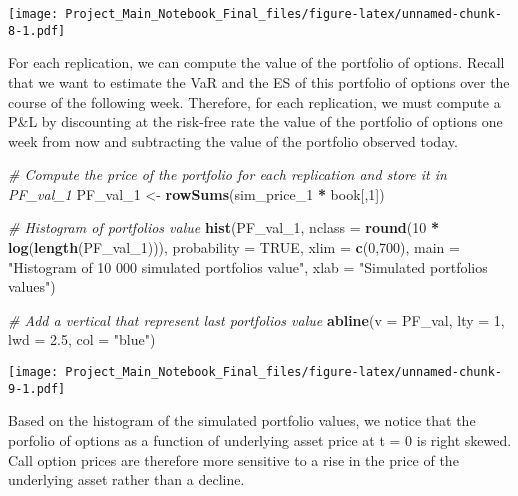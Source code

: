 \documentclass[]{article}
\newenvironment{Shaded}{\begin{snugshade}}{\end{snugshade}}
\newcommand{\CommentTok}[1]{\textcolor[rgb]{0.56,0.35,0.01}{\textit{#1}}}
\newcommand{\DataTypeTok}[1]{\textcolor[rgb]{0.13,0.29,0.53}{#1}}
\newcommand{\DecValTok}[1]{\textcolor[rgb]{0.00,0.00,0.81}{#1}}
\newcommand{\FloatTok}[1]{\textcolor[rgb]{0.00,0.00,0.81}{#1}}
\newcommand{\KeywordTok}[1]{\textcolor[rgb]{0.13,0.29,0.53}{\textbf{#1}}}
\newcommand{\NormalTok}[1]{#1}
\newcommand{\OperatorTok}[1]{\textcolor[rgb]{0.81,0.36,0.00}{\textbf{#1}}}
\newcommand{\OtherTok}[1]{\textcolor[rgb]{0.56,0.35,0.01}{#1}}
\newcommand{\StringTok}[1]{\textcolor[rgb]{0.31,0.60,0.02}{#1}}
\begin{document}
\texttt{[image: Project\_Main\_Notebook\_Final\_files/figure-latex/unnamed-chunk-8-1.pdf]}

For each replication, we can compute the value of the portfolio of
options. Recall that we want to estimate the VaR and the ES of this
portfolio of options over the course of the following week. Therefore,
for each replication, we must compute a P\&L by discounting at the
risk-free rate the value of the portfolio of options one week from now
and subtracting the value of the portfolio observed today.

\begin{Shaded}
\begin{Highlighting}[]
\CommentTok{\# Compute the price of the portfolio for each replication and store it in \textquotesingle{}PF\_val\_1\textquotesingle{}}
\NormalTok{PF\_val\_}\DecValTok{1}\NormalTok{ <{-}}\StringTok{ }\KeywordTok{rowSums}\NormalTok{(sim\_price\_}\DecValTok{1} \OperatorTok{*}\StringTok{ }\NormalTok{book[,}\DecValTok{1}\NormalTok{])}

\CommentTok{\# Histogram of portfolio\textquotesingle{}s value}
\KeywordTok{hist}\NormalTok{(PF\_val\_}\DecValTok{1}\NormalTok{, }\DataTypeTok{nclass =} \KeywordTok{round}\NormalTok{(}\DecValTok{10} \OperatorTok{*}\StringTok{ }\KeywordTok{log}\NormalTok{(}\KeywordTok{length}\NormalTok{(PF\_val\_}\DecValTok{1}\NormalTok{))),}
               \DataTypeTok{probability =} \OtherTok{TRUE}\NormalTok{, }\DataTypeTok{xlim =} \KeywordTok{c}\NormalTok{(}\DecValTok{0}\NormalTok{,}\DecValTok{700}\NormalTok{),}
               \DataTypeTok{main =} \StringTok{"Histogram of 10 000 simulated portfolios value"}\NormalTok{,}
               \DataTypeTok{xlab =} \StringTok{"Simulated portfolios values"}\NormalTok{)}

\CommentTok{\# Add a vertical that represent last portfolio\textquotesingle{}s value}
\KeywordTok{abline}\NormalTok{(}\DataTypeTok{v   =}\NormalTok{ PF\_val,}
       \DataTypeTok{lty =} \DecValTok{1}\NormalTok{,}
       \DataTypeTok{lwd =} \FloatTok{2.5}\NormalTok{,}
       \DataTypeTok{col =} \StringTok{"blue"}\NormalTok{)}
\end{Highlighting}
\end{Shaded}

\texttt{[image: Project\_Main\_Notebook\_Final\_files/figure-latex/unnamed-chunk-9-1.pdf]}

Based on the histogram of the simulated portfolio values, we notice that
the porfolio of options as a function of underlying asset price at t = 0
is right skewed. Call option prices are therefore more sensitive to a
rise in the price of the underlying asset rather than a decline.
\end{document}
